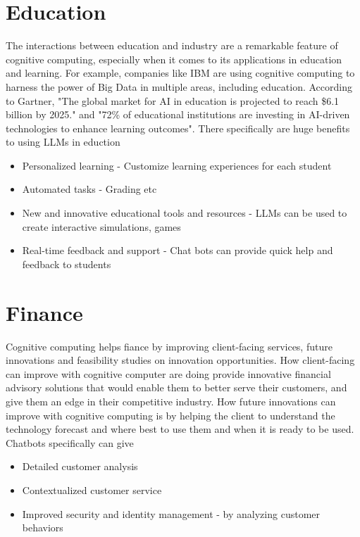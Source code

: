 \documentclass{article}
\begin{document}
\section{Education}
The interactions between education and industry are a remarkable feature of cognitive computing, especially when it comes to its applications in education and learning. For example, companies like IBM are using cognitive computing to harness the power of Big Data in multiple areas, including education.
According to Gartner, "The global market for AI in education is projected to reach \$6.1 billion by 2025." \cite{emb} and "72\% of educational institutions are investing in AI-driven technologies to enhance learning outcomes".
There specifically are huge benefits to using LLMs in eduction 
\begin{itemize}
    \item Personalized learning - Customize learning experiences for each student
    \item Automated tasks - Grading etc
    \item New and innovative educational tools and resources - LLMs can be used to create interactive simulations, games
    \item Real-time feedback and support - Chat bots can provide quick help and feedback to students
\end{itemize} \cite{packtpub}

\section{Finance}
Cognitive computing helps fiance by improving client-facing services, future innovations and feasibility studies on innovation opportunities. How client-facing can improve with cognitive computer are doing provide innovative financial advisory solutions that would enable them to better serve their customers, and give them an edge in their competitive industry. How future innovations can improve with cognitive computing is by helping the client to understand the technology forecast and where best to use them and when it is ready to be used.
Chatbots specifically can give
\begin{itemize}
    \item Detailed customer analysis
    \item Contextualized customer service
    \item Improved security and identity management - by analyzing customer behaviors
\end{itemize} \cite{pulse}
\end{document}
